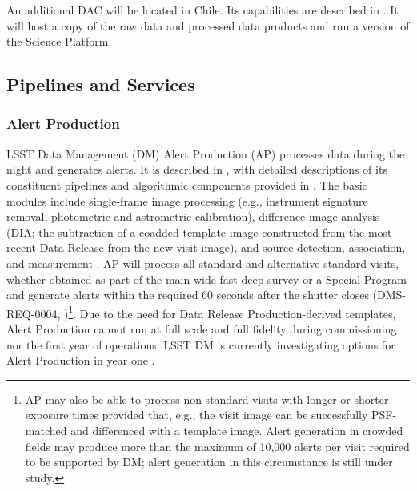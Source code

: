 An additional DAC will be located in Chile.
Its capabilities are described in .
It will host a copy of the raw data and processed data products and run a version of the Science Platform.

\subsection{Pipelines and Services}

\subsubsection{Alert Production}\label{sec:AP}

LSST Data Management (DM) Alert Production (AP) processes data during the night and generates alerts.
It is described in , with detailed descriptions of its constituent pipelines and algorithmic components provided in .
The basic modules include single-frame image processing (e.g., instrument signature removal, photometric and astrometric calibration), difference image analysis (DIA; the subtraction of a coadded template image constructed from the most recent Data Release from the new visit image), and source detection, association, and measurement .
AP will process all standard and alternative standard visits, whether obtained as part of the main wide-fast-deep survey or a Special Program  and generate alerts within the required 60 seconds after the shutter closes (DMS-REQ-0004, )\footnote{
AP may also be able to process non-standard visits with longer or shorter exposure times provided that, e.g., the visit image can be successfully PSF-matched and differenced with a template image.
Alert generation in crowded fields may produce more than the maximum of 10,000 alerts per visit required to be supported by DM; alert generation in this circumstance is still under study.
}.
Due to the need for Data Release Production-derived templates, Alert Production cannot run at full scale and full fidelity during commissioning nor the first year of operations.  LSST DM is currently investigating options for Alert Production in year one .

